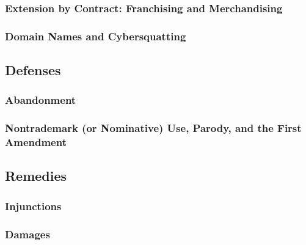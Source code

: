 \subsubsection{Extension by Contract: Franchising and Merchandising}


\subsubsection{Domain Names and Cybersquatting}


\subsection{Defenses}

\subsubsection{Abandonment}


\subsubsection{Nontrademark (or Nominative) Use, Parody, and the First 
Amendment}


\subsection{Remedies}

\subsubsection{Injunctions}


\subsubsection{Damages}

